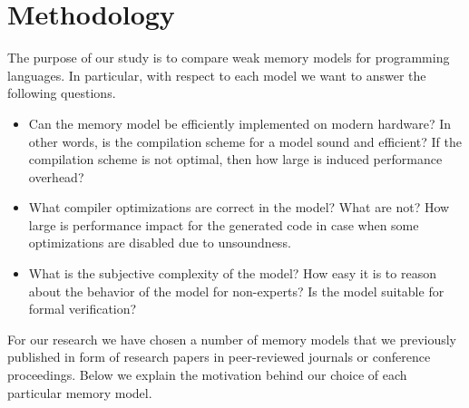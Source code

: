 \section{Methodology}

The purpose of our study is to compare weak memory models for programming languages.
In particular, with respect to each model we want to answer the following questions.

\begin{itemize}
  
  \item Can the memory model be efficiently implemented on modern hardware? 
    In other words, is the compilation scheme for a model sound and efficient?
    If the compilation scheme is not optimal, then how large is induced performance overhead?

  \item What compiler optimizations are correct in the model? What are not? 
    How large is performance impact for the generated code in case when 
    some optimizations are disabled due to unsoundness.

  \item What is the subjective complexity of the model?
    How easy it is to reason about the behavior of the model for non-experts?
    Is the model suitable for formal verification?
  
\end{itemize}

For our research we have chosen a number of memory models 
that we previously published in form of research papers 
in peer-reviewed journals or conference proceedings. 
Below we explain the motivation behind our choice of each particular memory model.  


